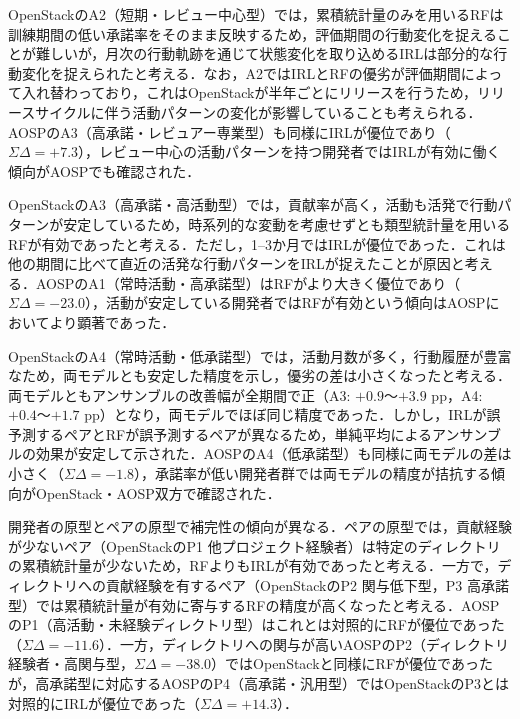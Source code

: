 \documentclass[submit]{ipsj}
\begin{document}
OpenStackのA2（短期・レビュー中心型）では，累積統計量のみを用いるRFは訓練期間の低い承諾率をそのまま反映するため，評価期間の行動変化を捉えることが難しいが，月次の行動軌跡を通じて状態変化を取り込めるIRLは部分的な行動変化を捉えられたと考える．なお，A2ではIRLとRFの優劣が評価期間によって入れ替わっており，これはOpenStackが半年ごとにリリースを行うため，リリースサイクルに伴う活動パターンの変化が影響していることも考えられる．AOSPのA3（高承諾・レビュアー専業型）も同様にIRLが優位であり（$\Sigma\Delta=+7.3$），レビュー中心の活動パターンを持つ開発者ではIRLが有効に働く傾向がAOSPでも確認された．

OpenStackのA3（高承諾・高活動型）では，貢献率が高く，活動も活発で行動パターンが安定しているため，時系列的な変動を考慮せずとも類型統計量を用いるRFが有効であったと考える．ただし，1--3か月ではIRLが優位であった．これは他の期間に比べて直近の活発な行動パターンをIRLが捉えたことが原因と考える．AOSPのA1（常時活動・高承諾型）はRFがより大きく優位であり（$\Sigma\Delta=-23.0$），活動が安定している開発者ではRFが有効という傾向はAOSPにおいてより顕著であった．

OpenStackのA4（常時活動・低承諾型）では，活動月数が多く，行動履歴が豊富なため，両モデルとも安定した精度を示し，優劣の差は小さくなったと考える．
両モデルともアンサンブルの改善幅が全期間で正（A3: $+0.9$〜$+3.9$ pp，A4: $+0.4$〜$+1.7$ pp）となり，両モデルでほぼ同じ精度であった．しかし，IRLが誤予測するペアとRFが誤予測するペアが異なるため，単純平均によるアンサンブルの効果が安定して示された．AOSPのA4（低承諾型）も同様に両モデルの差は小さく（$\Sigma\Delta=-1.8$），承諾率が低い開発者群では両モデルの精度が拮抗する傾向がOpenStack・AOSP双方で確認された．

開発者の原型とペアの原型で補完性の傾向が異なる．ペアの原型では，貢献経験が少ないペア（OpenStackのP1 他プロジェクト経験者）は特定のディレクトリの累積統計量が少ないため，RFよりもIRLが有効であったと考える．一方で，ディレクトリへの貢献経験を有するペア（OpenStackのP2 関与低下型，P3 高承諾型）では累積統計量が有効に寄与するRFの精度が高くなったと考える．AOSPのP1（高活動・未経験ディレクトリ型）はこれとは対照的にRFが優位であった（$\Sigma\Delta=-11.6$）．一方，ディレクトリへの関与が高いAOSPのP2（ディレクトリ経験者・高関与型，$\Sigma\Delta=-38.0$）ではOpenStackと同様にRFが優位であったが，高承諾型に対応するAOSPのP4（高承諾・汎用型）ではOpenStackのP3とは対照的にIRLが優位であった（$\Sigma\Delta=+14.3$）．

\end{document}
